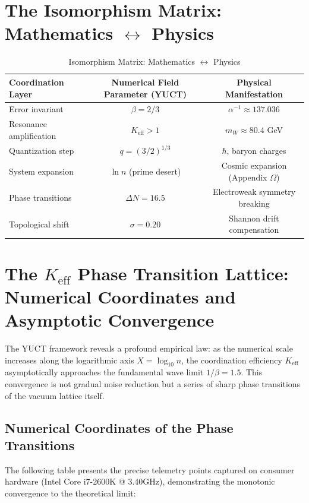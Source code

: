 \documentclass[12pt,a4paper]{article}
\theoremstyle{remark}
\newcommand{\Keff}{K_{\mathrm{eff}}}
\begin{document}
	\section{The Isomorphism Matrix: Mathematics \(\leftrightarrow\) Physics}
	
	\begin{table}[H]
		\centering
		\caption{Isomorphism Matrix: Mathematics \(\leftrightarrow\) Physics}
		\label{tab:isomorphism}
		\begin{tabular}{lcc}
			\toprule
			\textbf{Coordination Layer} & \textbf{Numerical Field Parameter (YUCT)} & \textbf{Physical Manifestation} \\
			\midrule
			Error invariant & \(\beta = 2/3\) & \(\alpha^{-1} \approx 137.036\) \\
			Resonance amplification & \(\Keff > 1\) & \(m_W \approx 80.4\) GeV \\
			Quantization step & \(q = (3/2)^{1/3}\) & \(\hbar\), baryon charges \\
			System expansion & \(\ln n\) (prime desert) & Cosmic expansion (Appendix \(\Omega\)) \\
			Phase transitions & \(\Delta N = 16.5\) & Electroweak symmetry breaking \\
			Topological shift & \(\sigma = 0.20\) & Shannon drift compensation \\
			\bottomrule
		\end{tabular}
	\end{table}
	
	\section{The \(K_{\mathrm{eff}}\) Phase Transition Lattice: Numerical Coordinates and Asymptotic Convergence}
	\label{sec:keff-lattice}
	
	The YUCT framework reveals a profound empirical law: as the numerical scale increases along the logarithmic axis \(X = \log_{10} n\), the coordination efficiency \(\Keff\) asymptotically approaches the fundamental wave limit \(1/\beta = 1.5\). This convergence is not gradual noise reduction but a series of sharp phase transitions of the vacuum lattice itself.
	
	\subsection{Numerical Coordinates of the Phase Transitions}
	
	The following table presents the precise telemetry points captured on consumer hardware (Intel Core i7-2600K @ 3.40GHz), demonstrating the monotonic convergence to the theoretical limit:
	
\end{document}
